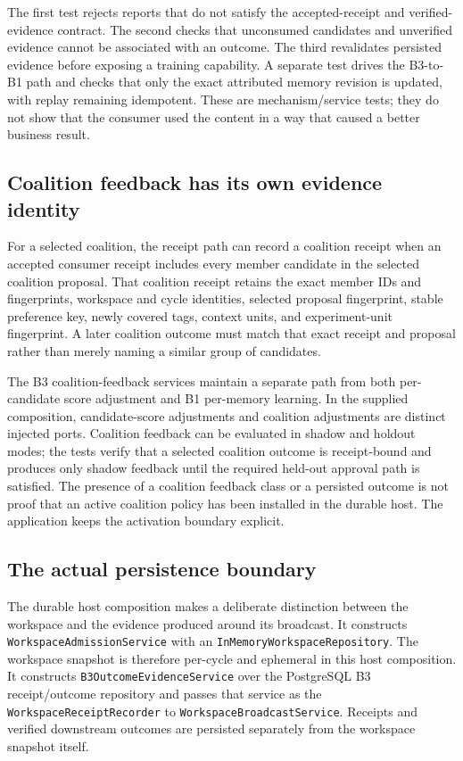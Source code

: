 The first test rejects reports that do not satisfy the accepted-receipt and verified-evidence contract. The second checks that unconsumed candidates and unverified evidence cannot be associated with an outcome. The third revalidates persisted evidence before exposing a training capability. A separate test drives the B3-to-B1 path and checks that only the exact attributed memory revision is updated, with replay remaining idempotent. These are mechanism/service tests; they do not show that the consumer used the content in a way that caused a better business result.

\subsection{Coalition feedback has its own evidence identity}
\label{subsec:ch21-b3-coalition-feedback}

For a selected coalition, the receipt path can record a coalition receipt when an accepted consumer receipt includes every member candidate in the selected coalition proposal. That coalition receipt retains the exact member IDs and fingerprints, workspace and cycle identities, selected proposal fingerprint, stable preference key, newly covered tags, context units, and experiment-unit fingerprint. A later coalition outcome must match that exact receipt and proposal rather than merely naming a similar group of candidates.

The B3 coalition-feedback services maintain a separate path from both per-candidate score adjustment and B1 per-memory learning. In the supplied composition, candidate-score adjustments and coalition adjustments are distinct injected ports. Coalition feedback can be evaluated in shadow and holdout modes; the tests verify that a selected coalition outcome is receipt-bound and produces only shadow feedback until the required held-out approval path is satisfied. The presence of a coalition feedback class or a persisted outcome is not proof that an active coalition policy has been installed in the durable host. The application keeps the activation boundary explicit.

\subsection{The actual persistence boundary}
\label{subsec:ch21-b3-persistence}

The durable host composition makes a deliberate distinction between the workspace and the evidence produced around its broadcast. It constructs \texttt{Workspace\allowbreak{}Admission\allowbreak{}Service} with an \texttt{In\allowbreak{}Memory\allowbreak{}Workspace\allowbreak{}Repository}. The workspace snapshot is therefore per-cycle and ephemeral in this host composition. It constructs \texttt{B3\allowbreak{}Outcome\allowbreak{}Evidence\allowbreak{}Service} over the PostgreSQL B3 receipt/outcome repository and passes that service as the \texttt{Workspace\allowbreak{}Receipt\allowbreak{}Recorder} to \texttt{Workspace\allowbreak{}Broadcast\allowbreak{}Service}. Receipts and verified downstream outcomes are persisted separately from the workspace snapshot itself.

